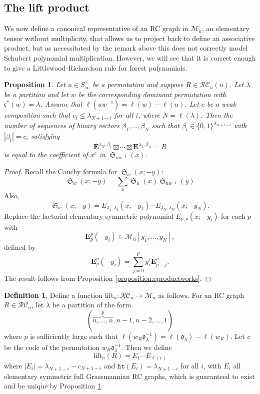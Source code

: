 \documentclass{amsart}
\newtheorem{proposition}[lemma]{Proposition}
\theoremstyle{definition}
\newtheorem{definition}[lemma]{Definition}
\theoremstyle{remark}
\numberwithin{equation}{subsection}
\DeclareMathOperator{\sch}{\mathfrak{S}}
\newcommand{\wof}[1]{w_{#1}}
\newcommand{\hr}{\mathtt{ht}}
\newcommand{\RC}{\mathcal{RC}}
\newcommand{\dom}{\mathfrak{d}}
\newcommand{\code}{\mathfrak{c}}
\begin{document}
\subsection{The lift product}\label{section:liftproduct}

We now define a canonical representative of an RC graph in $\mathcal{M}_n$, an elementary tensor without multiplicity, that allows us to project back to define an associative product, but as necessitated by the remark above this does not correctly model Schubert polynomial multiplication. However, we will see that it is correct enough to give a Littlewood-Richardson rule for forest polynomials.

\begin{proposition} \label{proposition:elemfactor}
  Let $u\in S_\infty$ be a permutation and suppose $R\in \RC_n(u)$. Let $\lambda$ be a partition and let $w$ be the corresponding dominant permutation with $\code^*(w)=\lambda$. Assume that $\ell(uw^{-1}) = \ell(w)-\ell(u)$. Let $c$ be a weak composition such that $c_i\leq \lambda_{N+1-i}$ for all $i$, where $N=\ell(\lambda)$. Then the number of sequences of binary vectors $\beta_1,\ldots,\beta_N$ such that $\beta_i\in\{0,1\}^{\lambda_{N+1-i}}$ with $|\beta_i|=c_i$ satisfying
  $$\mathbf{E}^{\lambda_N;\beta_1}\boxtimes\cdots\boxtimes \mathbf{E}^{\lambda_1;\beta_N} = R$$
is equal to the coefficient of $x^{c}$ in $\sch_{uw^{-1}}(x)$.
\end{proposition}
\begin{proof}
  Recall the Cauchy formula for $\sch_w(x;-y)$:
  $$\sch_w(x;-y)=\sum_u \sch_u(x)\sch_{uw^{-1}}(y)$$
  Also,
  $$\sch_w(x;-y) = E_{\lambda_1,\lambda_1}(x;-y_1)\cdots E_{\lambda_N,\lambda_N}(x;-y_N).$$
Replace the factorial elementary symmetric polynomial $E_{p,p}(x;-y_i)$ for each $p$ with
$$\mathbf{E}_p^p(-y_i)\in \mathcal{M}_n[y_1,\ldots,y_N],$$
defined by
$$\mathbf{E}_p^p(-y_i) = \sum_{j=0}^p y_i^j \mathbf{E}_{p-j}^p.$$
The result follows from Proposition \ref{proposition:eproductworks}.
\end{proof}



\begin{definition}
  Define a function $\mathrm{lift}_n:\RC_n\to \mathcal{M}_n$ as follows. For an RC graph $R\in \RC_n$, let $\lambda$ be a partition of the form 
$$(\overbrace{n,\ldots,n}^{p},n-1,n-2,\ldots,1)$$
where $p$ is sufficiently large such that $\ell(\wof{R}\dom_\lambda^{-1}) = \ell(\dom_\lambda) - \ell(\wof{R})$.  Let $c$ be the code of the permutation $\wof{R}\dom_\lambda^{-1}$. Then we define
$$\mathrm{lift}_n(R) = E_1 \cdots  E_{\ell(c)}$$
where $|E_i| = \lambda_{N + 1 - i} - c_{N+1-i}$ and $\hr(E_i) = \lambda_{N+1-i}$ for all $i$, with $E_i$ all elementary symmetric full Grassmannian RC graphs, which is guaranteed to exist and be unique by Proposition \ref{proposition:elemfactor}.
\end{definition}
\end{document}
